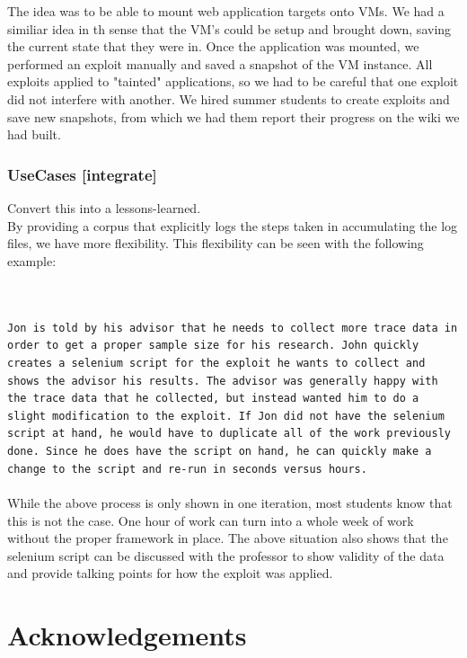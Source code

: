 \documentclass[letterpaper,twocolumn,10pt]{article}
\begin{document}
The idea was to be able to mount web application targets onto VMs.  We had a similiar idea in th sense that the VM's could be setup and brought down, saving the current state that they were in.  Once the application was mounted, we performed an exploit manually and saved a snapshot of the VM instance.  All exploits applied to "tainted" applications, so we had to be careful that one exploit did not interfere with another.  We hired summer students to create exploits and save new snapshots, from which we had them report their progress on the wiki we had built.  \\

\subsubsection{UseCases [integrate]}
Convert this into a lessons-learned. \\

By providing a corpus that explicitly logs the steps taken in accumulating the log files, we have more flexibility.  This flexibility can be seen with the following example:  

\\\\
{\tt Jon is told by his advisor that he needs to collect more trace data in order to get a proper sample size for his research.  John quickly creates a selenium script for the exploit he wants to collect and shows the advisor his results.  The advisor was generally happy with the trace data that he collected, but instead wanted him to do a slight modification to the exploit.  If Jon did not have the selenium script at hand, he would have to duplicate all of the work previously done.  Since he does have the script on hand, he can quickly make a change to the script and re-run in seconds versus hours.}
\\\\


While the above process is only shown in one iteration, most students know that this is not the case.  One hour of work can turn into a whole week of work without the proper framework in place.  The above situation also shows that the selenium script can be discussed with the professor to show validity of the data and provide talking points for how the exploit was applied.


\section{Acknowledgements}
\end{document}
